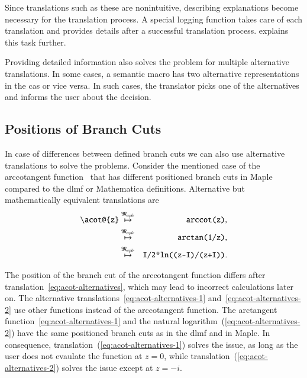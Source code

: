 \documentclass[a4paper,11pt]{article}
\newcommand{\Maple}{Maple}
\newcommand{\Mathematica}{Mathematica}
\newcommand{\langMaple}{\mathfrak{M}_{aple}}
\theoremstyle{defTheoStyle}
\theoremstyle{defExampStyle}
\DeclareRobustCommand{\iunit}{{i}}
\begin{document}
\vspace{-0.2cm}
Since translations such as these are nonintuitive, describing explanations become necessary for the translation process. A special logging function takes care of each translation and provides details after a successful translation process.  explains this task further.

Providing detailed information also solves the problem for multiple alternative translations. In some cases, a semantic macro has two alternative representations in the \gls*{cas} or vice versa. In such cases, the translator picks one of the alternatives and informs the user about the decision.

\subsection{Positions of Branch Cuts}
In case of differences between defined branch cuts we can also use alternative translations to solve the problems. Consider the mentioned case of the arccotangent function~\parencite{Branches:acot} that has different positioned branch cuts in \Maple{} compared to the \gls*{dlmf} or \Mathematica{} definitions. Alternative but mathematically equivalent translations are
\begin{eqnarray}
\verb|\acot@{z}| & \overset{\langMaple}{\mapsto} & \verb|arccot(z)|,\label{eq:acot-alternatives}\\
& \overset{\langMaple}{\mapsto} & \verb|arctan(1/z)|,\label{eq:acot-alternatives-1}\\
& \overset{\langMaple}{\mapsto} & \verb|I/2*ln((z-I)/(z+I))|.\label{eq:acot-alternatives-2}
\end{eqnarray}

\vspace{-0.2cm}
The position of the branch cut of the arccotangent function differs after translation~\eqref{eq:acot-alternatives}, which may lead to incorrect calculations later on. The alternative translations~\eqref{eq:acot-alternatives-1} and~\eqref{eq:acot-alternatives-2} use other functions instead of the arccotangent function. The arctangent function~\eqref{eq:acot-alternatives-1} and the natural logarithm~(\ref{eq:acot-alternatives-2}) have the same positioned branch cuts as in the \gls*{dlmf} and in \Maple. In consequence, translation~(\ref{eq:acot-alternatives-1}) solves the issue, as long as the user does not evaulate the function at $z = 0$, while translation~(\ref{eq:acot-alternatives-2}) solves the issue except at $z = -\iunit$.
\end{document}
